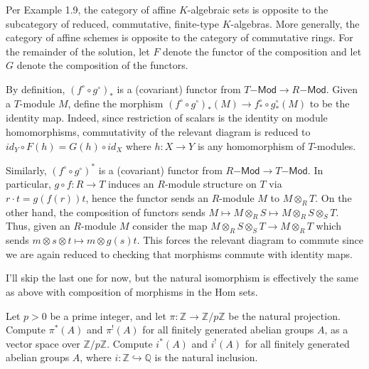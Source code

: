 \documentclass[../../master.tex]{subfiles}
\begin{document}
\begin{solution}
    Per Example 1.9, the category of affine $K$-algebraic sets is opposite to the subcategory of reduced, commutative, finite-type $K$-algebras.
    More generally, the category of affine schemes is opposite to the category of commutative rings.
    For the remainder of the solution, let $F$ denote the functor of the composition and let $G$ denote the composition of the functors.
    
    By definition, $(f^{\circ} \circ g^{\circ})_{*}$ is a (covariant) functor from $ T\mathsf{-Mod} \to R\mathsf{-Mod}$.
    Given a $T$-module $M$, define the morphism $(f^{\circ} \circ g^{\circ})_{*}(M) \to f^{\circ}_* \circ g^{\circ}_*(M)$ to be the identity map.
    Indeed, since restriction of scalars is the identity on module homomorphisms, commutativity of the relevant diagram is reduced to $id_Y \circ F(h) = G(h) \circ id_X$ where $h : X \to Y$ is any homomorphism of $T$-modules.

    Similarly, $(f^{\circ} \circ g^{\circ})^{*}$ is a (covariant) functor from $R\mathsf{-Mod} \to T\mathsf{-Mod}$.
    In particular, $g \circ f: R \to T$ induces an $R$-module structure on $T$ via $r \cdot t = g(f(r))t$, hence the functor sends an $R$-module $M$ to $M \otimes_R T$.
    On the other hand, the composition of functors sends $M \mapsto M \otimes_R S \mapsto M \otimes_R S \otimes_S T$.
    Thus, given an $R$-module $M$ consider the map $M \otimes_R S \otimes_S T \to M \otimes_R T$ which sends $m \otimes s \otimes t \mapsto m \otimes g(s) t$.
    This forces the relevant diagram to commute since we are again reduced to checking that morphisms commute with identity maps.

    I'll skip the last one for now, but the natural isomorphism is effectively the same as above with composition of morphisms in the Hom sets.
\end{solution}

\begin{problem}
    Let $p > 0$ be a prime integer, and let $\pi : \mathbb{Z} \to \mathbb{Z}/p\mathbb{Z}$ be the natural projection.
    Compute $\pi^{*}(A)$ and $\pi^{!}(A)$ for all finitely generated abelian groups $A$, as a vector space over $\mathbb{Z}/p\mathbb{Z}$.
    Compute $i^{*}(A)$ and $i^{!}(A)$ for all finitely generated abelian groups $A$, where $i : \mathbb{Z} \hookrightarrow \mathbb{Q}$ is the natural inclusion.
\end{problem}
\end{document}
